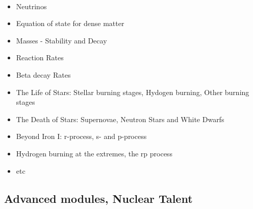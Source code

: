 \documentclass[%
twoside,                 %
final,                   %
10pt]{article}
\begin{document}
\paragraph{}
\begin{itemize}
\item Neutrinos

\item Equation of state for dense matter

\item Masses - Stability and Decay

\item Reaction Rates

\item Beta decay Rates	

\item The Life of Stars: Stellar burning stages, Hydogen burning, Other burning stages

\item The Death of Stars: Supernovae, Neutron Stars and White Dwarfs

\item Beyond Iron I: r-process, s- and p-process

\item Hydrogen burning at the extremes, the rp process

\item etc
\end{itemize}

\noindent




\subsection*{Advanced  modules, Nuclear Talent}

\end{document}
